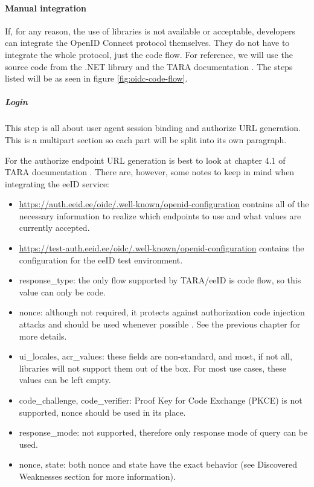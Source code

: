 \paragraph{Manual integration} If, for any reason, the use of libraries is not available or acceptable, developers can integrate the OpenID Connect protocol themselves. They do not have to integrate the whole protocol, just the code flow. For reference, we will use the source code from the {.NET} library \cite{ms-auth-oidc-src} and the TARA documentation \cite{tara-technical}. The steps listed will be as seen in figure \ref{fig:oidc-code-flow}.

\subparagraph{Login}

This step is all about user agent session binding and {authorize URL} generation. This is a multipart section so each part will be split into its own paragraph.

For the {authorize} endpoint URL generation is best to look at chapter 4.1 of TARA documentation \cite{tara-technical}. There are, however, some notes to keep in mind when integrating the eeID service:

\begin{itemize}
  \item \url{https://auth.eeid.ee/oidc/.well-known/openid-configuration} contains all of the necessary information to realize which endpoints to use and what values are currently accepted.
  \item \url{https://test-auth.eeid.ee/oidc/.well-known/openid-configuration} contains the configuration for the eeID test environment.
  \item {response\_type}: the only flow supported by TARA/eeID is code flow, so this value can only be code.
  \item {nonce}: although not required, it protects against authorization code injection attacks and should be used whenever possible \cite{ietf-oauth-security-topics-19}. See the previous chapter for more details.
  \item {ui\_locales, acr\_values}: these fields are non-standard, and most, if not all, libraries will not support them out of the box. For most use cases, these values can be left empty.
  \item {code\_challenge, code\_verifier}: Proof Key for Code Exchange (PKCE) is not supported, {nonce} should be used in its place.
  \item {response\_mode}: not supported, therefore only response mode of {query} can be used.
  \item {nonce, state}: both nonce and state have the exact behavior (see Discovered Weaknesses section for more information).
\end{itemize}

